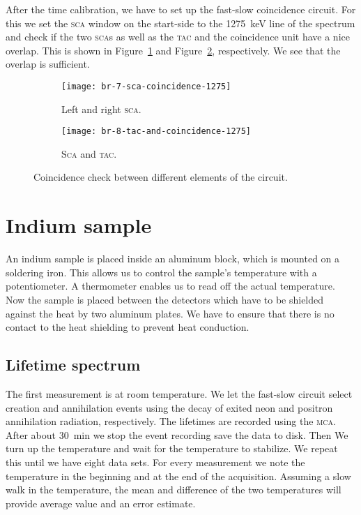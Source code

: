 \documentclass[11pt, english, fleqn, DIV=15, headinclude, BCOR=2cm]{scrreprt}
\begin{document}
After the time calibration, we have to set up the fast-slow coincidence
circuit. For this we set the \textsc{sca} window on the start-side
to the \SI{1275}{\kilo\electronvolt} line of the spectrum and check if the
two \textsc{sca}s as well as the \textsc{tac} and the coincidence unit have
a nice overlap. This is shown in Figure~\ref{fig:7-sca-coincidence-1275} and
Figure~\ref{fig:8-tac-and-coincidence-1275}, respectively. We see that the
overlap is sufficient.

\begin{figure}
    \centering
    \begin{subfigure}[c]{0.48\linewidth}
        \centering
        \texttt{[image: br-7-sca-coincidence-1275]}
        \caption{%
                Left and right \textsc{sca}.
        }
        \label{fig:7-sca-coincidence-1275}
    \end{subfigure}
    \hfill
    \begin{subfigure}[c]{0.48\linewidth}
        \centering
        \texttt{[image: br-8-tac-and-coincidence-1275]}
        \caption{%
                \textsc{Sca} and \textsc{tac}.
        }
        \label{fig:8-tac-and-coincidence-1275}
    \end{subfigure}
    \caption{%
        Coincidence check between different elements of the circuit.
    }
    \label{fig:}
\end{figure}

\section{Indium sample}

An indium sample is placed inside an aluminum block, which is mounted on a
soldering iron. This allows us to control the sample's temperature with a
potentiometer. A thermometer enables us to read off the actual temperature. Now
the sample is placed between the detectors which have to be shielded against
the heat by two aluminum plates. We have to ensure that there is no contact to
the heat shielding to prevent heat conduction. 

\subsection{Lifetime spectrum}

The first measurement is at room temperature. We let the fast-slow circuit
select creation and annihilation events using the decay of exited neon and
positron annihilation radiation, respectively. The lifetimes are recorded using
the \textsc{mca}. After about \SI{30}{\minute} we stop the event recording save
the data to disk. Then We turn up the temperature and wait for the temperature
to stabilize. We repeat this until we have eight data sets. For every
measurement we note the temperature in the beginning and at the end of the
acquisition. Assuming a slow walk in the temperature, the mean and difference
of the two temperatures will provide average value and an error estimate.
\end{document}
